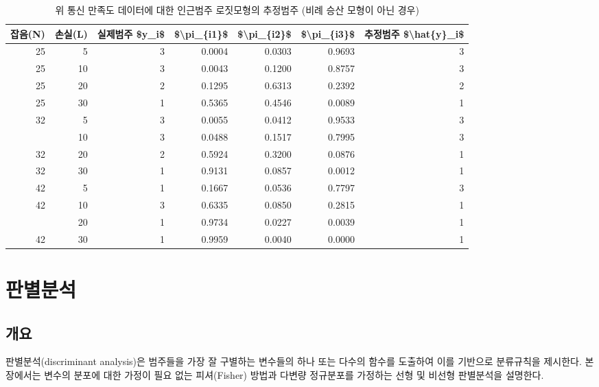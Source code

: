 \documentclass[
]{book}
\begin{document}
\begin{table}

\caption{\label{tab:adjacent-category-logit-prediction-nonproportional}위 통신 만족도 데이터에 대한 인근범주 로짓모형의 추정범주 (비례 승산 모형이 아닌 경우)}
\centering
\begin{tabular}[t]{rrrrrrr}
\toprule
잡음(N) & 손실(L) & 실제범주 \$y\_i\$ & \$\textbackslash{}pi\_\{i1\}\$ & \$\textbackslash{}pi\_\{i2\}\$ & \$\textbackslash{}pi\_\{i3\}\$ & 추정범주 \$\textbackslash{}hat\{y\}\_i\$\\
\midrule
25 & 5 & 3 & 0.0004 & 0.0303 & 0.9693 & 3\\
25 & 10 & 3 & 0.0043 & 0.1200 & 0.8757 & 3\\
25 & 20 & 2 & 0.1295 & 0.6313 & 0.2392 & 2\\
25 & 30 & 1 & 0.5365 & 0.4546 & 0.0089 & 1\\
32 & 5 & 3 & 0.0055 & 0.0412 & 0.9533 & 3\\
\addlinespace
32 & 10 & 3 & 0.0488 & 0.1517 & 0.7995 & 3\\
32 & 20 & 2 & 0.5924 & 0.3200 & 0.0876 & 1\\
32 & 30 & 1 & 0.9131 & 0.0857 & 0.0012 & 1\\
42 & 5 & 1 & 0.1667 & 0.0536 & 0.7797 & 3\\
42 & 10 & 3 & 0.6335 & 0.0850 & 0.2815 & 1\\
\addlinespace
42 & 20 & 1 & 0.9734 & 0.0227 & 0.0039 & 1\\
42 & 30 & 1 & 0.9959 & 0.0040 & 0.0000 & 1\\
\bottomrule
\end{tabular}
\end{table}

\hypertarget{da}{%
\chapter{판별분석}\label{da}}

\hypertarget{da-overview}{%
\section{개요}\label{da-overview}}

판별분석(discriminant analysis)은 범주들을 가장 잘 구별하는 변수들의 하나 또는 다수의 함수를 도출하여 이를 기반으로 분류규칙을 제시한다. 본 장에서는 변수의 분포에 대한 가정이 필요 없는 피셔(Fisher) 방법과 다변량 정규분포를 가정하는 선형 및 비선형 판별분석을 설명한다.
\end{document}

